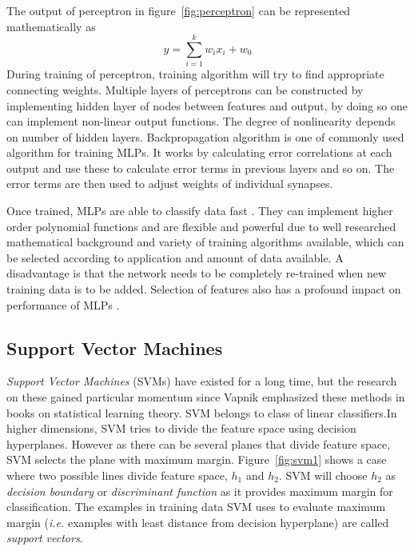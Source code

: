 The output of perceptron in figure~\ref{fig:perceptron} can be represented mathematically as
\[ y = \sum\limits_{i=1}^k w_ix_i + w_0 \]
During training of perceptron, training algorithm will try to find appropriate connecting weights. Multiple layers of perceptrons can be constructed by implementing hidden layer of nodes between features and output, by doing so one can implement non-linear output functions. The degree of nonlinearity depends on number of hidden layers. Backpropagation algorithm \cite{Rumelhart1985} is one of commonly used algorithm for training MLPs. It works by calculating error correlations at each output and use these to calculate error terms in previous layers and so on. The error terms are then used to adjust weights of individual synapses.

Once trained, MLPs are able to classify data fast \cite{Alpaydin2004}. They can implement higher order polynomial functions and are flexible and powerful due to well researched mathematical background and variety of training algorithms available, which can be selected according to application and amount of data available. A disadvantage is that the network needs to be completely re-trained when new training data is to be added. Selection of features also has a profound impact on performance of MLPs \cite{Kavzoglu2002, El-Khatib2010}.

\subsection{Support Vector Machines}

\emph{Support Vector Machines} (SVMs) have existed for a long time, but the research on these gained particular momentum since Vapnik \cite{Vapnik1995} emphasized these methods in books on statistical learning theory. SVM belongs to class of linear classifiers.In higher dimensions, SVM tries to divide the feature space using decision hyperplanes. However as there can be several planes that divide feature space, SVM selects the plane with maximum margin. Figure~\ref{fig:svm1} shows a case where two possible lines divide feature space, $h_1$ and $h_2$. SVM will choose $h_2$ as \emph{decision boundary} or \emph{discriminant function} as it provides maximum margin for classification. The examples in training data SVM uses to evaluate maximum margin (\emph{i.e.} examples with least distance from decision hyperplane) are called \emph{support vectors}.

